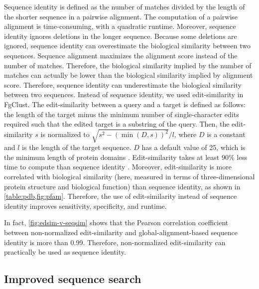 \documentclass{bioinfo}
\begin{document}
\begin{methods}
Sequence identity is defined as the number of matches divided by the length of the shorter sequence in a pairwise alignment.
The computation of a pairwise alignment is time-consuming, with a quadratic runtime. 
Moreover, sequence identity ignores deletions in the longer sequence.
Because some deletions are ignored, sequence identity can overestimate the biological similarity between two sequences.
Sequence alignment maximizes the alignment score instead of the number of matches.
Therefore, the biological similarity implied by the number of matches can actually be lower than the biological similarity implied by alignment score.
Therefore, sequence identity can underestimate the biological similarity between two sequences.
Instead of sequence identity, we used edit-similarity in FgClust.
The edit-similarity between a query and a target is defined as follows: 
the length of the target minus the minimum number of single-character edits required such that the edited target is a substring of the query.
Then, the edit-similarity \(s\) is normalized to \(\sqrt{ s^2-(\min(D,s))^2}/l\), where \(D\) is a constant and \(l\) is the length of the target sequence.
\(D\) has a default value of 25, which is the minimum length of protein domains \citep[page 8]{niazi2016biosimilars}.
Edit-similarity takes at least 90\% less time to compute than sequence identity \citep{vsovsic2017edlib}.
Moreover, edit-similarity is more correlated with biological similarity (here, measured in terms of three-dimensional protein structure and biological function) than sequence identity, as shown in \cref{table:pdb,fig:pfam}.
Therefore, the use of edit-similarity instead of sequence identity improves sensitivity, specificity, and runtime.

In fact, \cref{fig:edsim-v-seqsim} shows that the Pearson correlation coefficient between non-normalized edit-similarity and global-alignment-based sequence identity is more than \SI{0.99}{}. Therefore, non-normalized edit-similarity can practically be used as sequence identity.

\subsection{Improved sequence search}
\label{subsec:seqsearch}


\end{methods}
\end{document}
